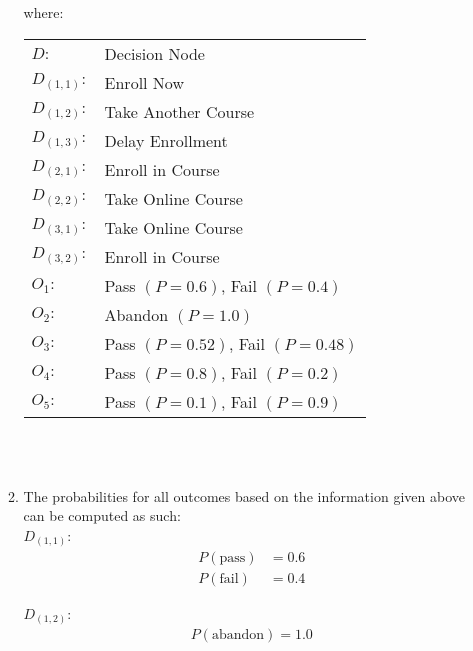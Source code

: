 \documentclass{article}
\begin{document}
\begin{enumerate}
\begin{enumerate}
{
        }

        where:
        \begin{center}
            \begin{tabular}{l l}
                $D:$ & Decision Node\\
                $D_{(1,1)}:$ & Enroll Now\\
                $D_{(1,2)}:$ & Take Another Course\\
                $D_{(1,3)}:$ & Delay Enrollment\\
                $D_{(2,1)}:$ & Enroll in Course\\
                $D_{(2,2)}:$ & Take Online Course\\
                $D_{(3,1)}:$ & Take Online Course\\
                $D_{(3,2)}:$ & Enroll in Course\\
                $O_1:$ & Pass $(P=0.6)$, Fail $(P=0.4)$\\
                $O_2:$ & Abandon $(P=1.0)$\\
                $O_3:$ & Pass $(P=0.52)$, Fail $(P=0.48)$\\
                $O_4:$ & Pass $(P=0.8)$, Fail $(P=0.2)$\\
                $O_5:$ & Pass $(P=0.1)$, Fail $(P=0.9)$
            \end{tabular}\\~\\
        \end{center}
        
        \item The probabilities for all outcomes based on the information given above can be computed as such:\\

        $D_{(1,1)}$:
        \begin{align*}
            P(\text{pass}) &= 0.6 \\
            P(\text{fail}) &= 0.4
        \end{align*}
        
        $D_{(1,2)}$:
        \begin{align*}
            P(\text{abandon}) = 1.0
        \end{align*}
        

\end{enumerate}
\end{enumerate}
\end{document}

